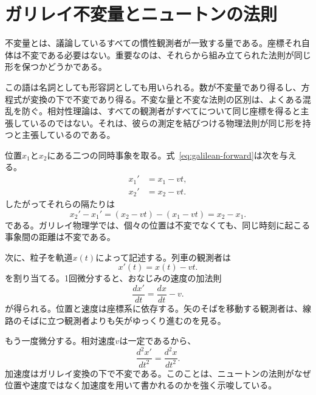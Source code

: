 \section{ガリレイ不変量とニュートンの法則}

不変量とは、議論しているすべての慣性観測者が一致する量である。座標それ自体は不変である必要はない。重要なのは、それらから組み立てられた法則が同じ形を保つかどうかである。

この語は名詞としても形容詞としても用いられる。数が不変量であり得るし、方程式が変換の下で不変であり得る。不変な量と不変な法則の区別は、よくある混乱を防ぐ。相対性理論は、すべての観測者がすべてについて同じ座標を得ると主張しているのではない。それは、彼らの測定を結びつける物理法則が同じ形を持つと主張しているのである。

位置\(x_1\)と\(x_2\)にある二つの同時事象を取る。式~\eqref{eq:galilean-forward}は次を与える。
\begin{align}
x_1'&=x_1-vt,\\
x_2'&=x_2-vt.
\end{align}
したがってそれらの隔たりは
\begin{equation}
x_2'-x_1'=(x_2-vt)-(x_1-vt)=x_2-x_1.
\end{equation}
である。ガリレイ物理学では、個々の位置は不変でなくても、同じ時刻に起こる事象間の距離は不変である。

\begin{classroomqa}
\end{classroomqa}

次に、粒子を軌道\(x(t)\)によって記述する。列車の観測者は
\begin{equation}
x'(t)=x(t)-vt.
\end{equation}
を割り当てる。1回微分すると、おなじみの速度の加法則
\begin{equation}
\frac{dx'}{dt}=\frac{dx}{dt}-v.
\end{equation}
が得られる。位置と速度は座標系に依存する。矢のそばを移動する観測者は、線路のそばに立つ観測者よりも矢がゆっくり進むのを見る。

もう一度微分する。相対速度\(v\)は一定であるから、
\begin{equation}
\frac{d^2x'}{dt^2}=\frac{d^2x}{dt^2}.
\end{equation}
加速度はガリレイ変換の下で不変である。このことは、ニュートンの法則がなぜ位置や速度ではなく加速度を用いて書かれるのかを強く示唆している。

